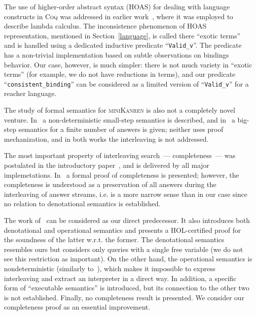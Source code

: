 The use of higher-order abstract syntax (HOAS) for dealing with language constructs in \textsc{Coq} was addressed in earlier work~\cite{HOASinCoq},
where it was employed to describe lambda calculus. The inconsistence phenomenon of HOAS representation, mentioned in Section~\ref{language}, is called
there ``exotic terms'' and is handled using a dedicated inductive predicate ``\lstinline|Valid_v|''. The predicate has a non-trivial implementation based
on subtle observations on bindings behavior. Our case, however, is much simpler: there is not much variety in ``exotic terms'' (for example, we do not have
reductions in terms), and our predicate ``\lstinline|consistent_binding|'' can be considered as a limited version of ``\lstinline|Valid_v|'' for a
reacher language.

The study of formal semantics for \textsc{miniKanren} is also not a completely novel venture. In~\cite{RelConversion} a non-deterministic
small-step semantics is described, and in~\cite{DivTest} a big-step semantics for a finite number of answers is given;
neither uses proof mechanization, and in both works the interleaving is not addressed. 

The most important property of interleaving search~--- completeness~--- was postulated in the introductory paper~\cite{Search}, and is delivered by
all major implemetations. In~\cite{2016} a formal proof of completeness is presented; however, the completeness is understood as a
preservation of all answers during the interleaving of answer streams, i.e. is a more narrow sense than in our case since no relation
to denotational semantics is established. 

The work of~\cite{MechanisingMiniKanren} can be considered as our direct predecessor. It also introduces both denotational and
operational semantics and presents a \textsc{HOL}-certified proof for the soundness of the latter w.r.t. the former. The denotational
semantics resembles ours but considers only queries with a single free variable (we do not see this restriction as important).
On the other hand, the operational semantics is nondeterministic (similarly to~\cite{RelConversion}), which makes it
impossible to express interleaving and extract an interpreter in a direct way. In addition, a specific form of ``executable semantics''
is introduced, but its connection to the other two is not established. Finally, no completeness result is presented.
We consider our completeness proof as an essential improvement. 




